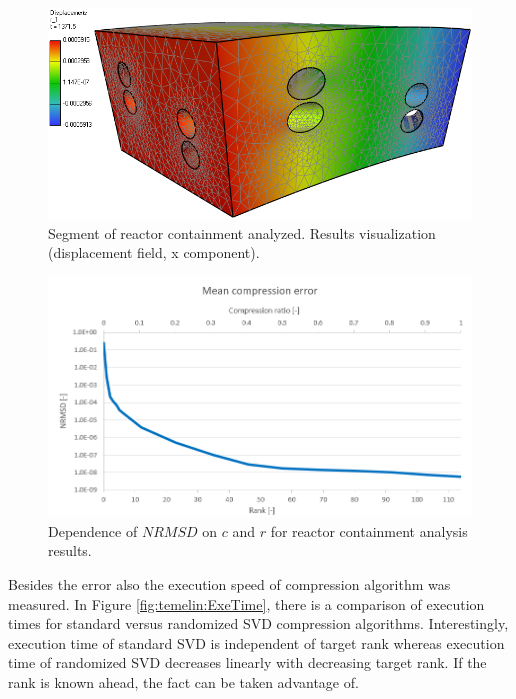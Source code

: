 \begin{figure}[H]
\centering
\includegraphics[width=\textwidth]{figures/chapter-SVD/temelin_screenshot}
\decoRule
\caption[Results visualization: reactor containment 3D.]{Segment of reactor containment analyzed. Results visualization (displacement field, x component).}
\label{fig:temelin:mesh}
\end{figure}

\begin{figure}[H]
\centering
\includegraphics[width=\textwidth]{figures/chapter-SVD/temelin_NRMSD}
\decoRule
\caption[Dependence of NRMSD on compression ratio and rank (reactor containment 3D).]{Dependence of $\mathit{NRMSD}$ on $c$ and $r$ for reactor containment analysis results.} %
\label{fig:temelin:NRMSD}
\end{figure}

Besides the error also the execution speed of compression algorithm was measured. In Figure \ref{fig:temelin:ExeTime}, there is a comparison of execution times for standard versus randomized SVD compression algorithms. Interestingly, execution time of standard SVD is independent of target rank whereas execution time of randomized SVD decreases linearly with decreasing target rank. If the rank is known ahead, the fact can be taken advantage of.

